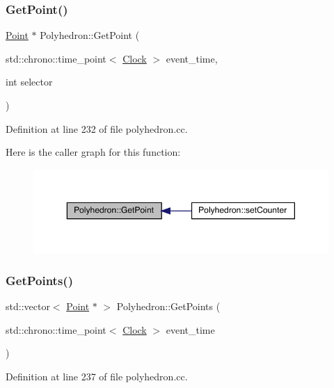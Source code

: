 \subsubsection{\texorpdfstring{Get\+Point()}{GetPoint()}}
{\footnotesize\ttfamily \hyperlink{class_point}{Point} $\ast$ Polyhedron\+::\+Get\+Point (\begin{DoxyParamCaption}\item[{std\+::chrono\+::time\+\_\+point$<$ \hyperlink{universe_8h_a0ef8d951d1ca5ab3cfaf7ab4c7a6fd80}{Clock} $>$}]{event\+\_\+time,  }\item[{int}]{selector }\end{DoxyParamCaption})}



Definition at line 232 of file polyhedron.\+cc.

Here is the caller graph for this function\+:
\nopagebreak
\begin{figure}[H]
\begin{center}
\leavevmode
\includegraphics[width=350pt]{class_polyhedron_a4d61f89c56e15d96008856cfb540d558_icgraph}
\end{center}
\end{figure}
\mbox{\label{class_polyhedron_a1430429d6c8447e90b8c94ca46496a59}} 
\subsubsection{\texorpdfstring{Get\+Points()}{GetPoints()}}
{\footnotesize\ttfamily std\+::vector$<$ \hyperlink{class_point}{Point} $\ast$ $>$ Polyhedron\+::\+Get\+Points (\begin{DoxyParamCaption}\item[{std\+::chrono\+::time\+\_\+point$<$ \hyperlink{universe_8h_a0ef8d951d1ca5ab3cfaf7ab4c7a6fd80}{Clock} $>$}]{event\+\_\+time }\end{DoxyParamCaption})}



Definition at line 237 of file polyhedron.\+cc.

